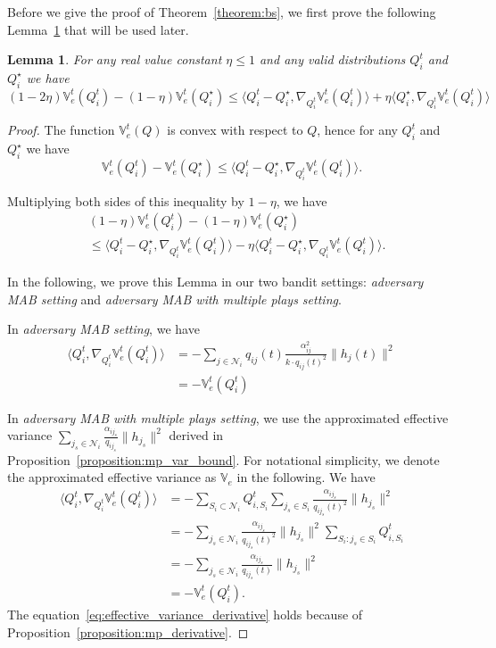 \documentclass{article}
\newtheorem{lemma}{Lemma}
\begin{document}
Before we give the proof of Theorem~\ref{theorem:bs},
we first prove the following Lemma~\ref{lemma:1} that
will be used later.
\begin{lemma}\label{lemma:1}
	For any real value constant $\eta\leq 1$ and any valid distributions $Q_i^t$ and $Q_i^{\star}$ we have
	\begin{equation}
		(1-2\eta)\mathbb{V}_e^t(Q_i^t)-(1-\eta)\mathbb{V}_e^t(Q_i^{\star})\leq \langle Q_i^t-Q_i^{\star}, \nabla_{Q_i^t}\mathbb{V}_e^t(Q_i^t)\rangle + \eta\langle Q_i^{\star}, \nabla_{Q_i^t}\mathbb{V}_e^t(Q_i^t)\rangle
	\end{equation}	
\end{lemma}
\begin{proof}
The function $\mathbb{V}_e^t(Q)$ is convex with respect to $Q$, hence for any $Q_i^t$ and $Q_i^{\star}$ we have
\begin{equation}
	\mathbb{V}_e^t(Q_i^t)-\mathbb{V}_e^t(Q_i^{\star})\leq \langle Q_i^{t}-Q_i^{\star}, \nabla_{Q_i^t}\mathbb{V}_e^t(Q_i^t)\rangle.
\end{equation}

Multiplying both sides of this inequality by $1-\eta$, we have
\begin{align}
	&(1-\eta)\mathbb{V}_e^t(Q_i^t)-(1-\eta)\mathbb{V}_e^t(Q_i^{\star}) \\
	&\leq \langle Q_i^{t}-Q_i^{\star}, \nabla_{Q_i^t}\mathbb{V}_e^t(Q_i^t)\rangle - \eta\langle Q_i^{t}-Q_i^{\star}, \nabla_{Q_i^t}\mathbb{V}_e^t(Q_i^t)\rangle.
\end{align}

In the following, we prove this Lemma in our two bandit settings: \textit{adversary MAB setting} and \textit{adversary MAB with multiple plays setting}.

In \textit{adversary MAB setting}, we have
\begin{align}
	\langle Q_i^t, \nabla_{Q_i^t}\mathbb{V}_e^t(Q_i^t)\rangle &= -\sum_{j\in\mathcal{N}_i}q_{ij}(t)\frac{\alpha_{ij}^2}{k\cdot q_{ij}(t)^2}\|h_j(t)\|^2 \\
	&= -\mathbb{V}_e^t(Q_i^t)
\end{align}

In \textit{adversary MAB with multiple plays setting}, we use the approximated effective variance $\sum_{j_s\in\mathcal{N}_i}\frac{\alpha_{ij_s}}{q_{ij_s}}\|h_{j_s}\|^2$ derived in Proposition~\ref{proposition:mp_var_bound}. For notational simplicity, we denote the approximated effective variance as $\mathbb{V}_e$ in the following. We have
\begin{align}
	\langle Q_i^t, \nabla_{Q_i^t}\mathbb{V}_e^t(Q_i^t)\rangle &= -\sum_{S_i\subset\mathcal{N}_i}Q_{i,S_i}^t\sum_{j_s\in S_i}\frac{\alpha_{ij_s}}{q_{ij_s}(t)^2}\|h_{j_s}\|^2 \label{eq:effective_variance_derivative} \\
	&= -\sum_{j_s\in\mathcal{N}_i}\frac{\alpha_{ij_s}}{q_{ij_s}(t)^2}\|h_{j_s}\|^2\sum_{S_i:j_s\in S_i}Q_{i,S_i}^t \\
	&= -\sum_{j_s\in\mathcal{N}_i}\frac{\alpha_{ij_s}}{q_{ij_s}(t)}\|h_{j_s}\|^2 \\
	&= -\mathbb{V}_e^t(Q_i^t).
\end{align}
The equation~\eqref{eq:effective_variance_derivative} holds because of Proposition~\ref{proposition:mp_derivative}.


\end{proof}
\end{document}
